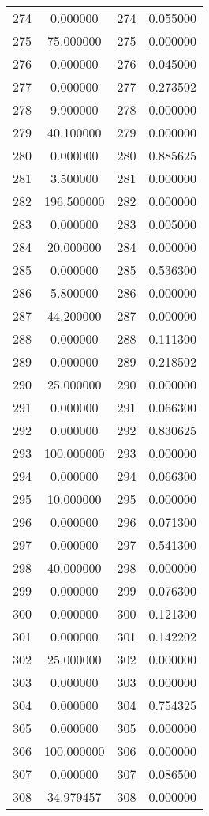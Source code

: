 \documentclass[12pt]{article}
\begin{document}
\begin{longtable}{@{}cccc@{}}
274 & 0.000000 & 274 & 0.055000 \\
275 & 75.000000 & 275 & 0.000000 \\
276 & 0.000000 & 276 & 0.045000 \\
277 & 0.000000 & 277 & 0.273502 \\
278 & 9.900000 & 278 & 0.000000 \\
279 & 40.100000 & 279 & 0.000000 \\
280 & 0.000000 & 280 & 0.885625 \\
281 & 3.500000 & 281 & 0.000000 \\
282 & 196.500000 & 282 & 0.000000 \\
283 & 0.000000 & 283 & 0.005000 \\
284 & 20.000000 & 284 & 0.000000 \\
285 & 0.000000 & 285 & 0.536300 \\
286 & 5.800000 & 286 & 0.000000 \\
287 & 44.200000 & 287 & 0.000000 \\
288 & 0.000000 & 288 & 0.111300 \\
289 & 0.000000 & 289 & 0.218502 \\
290 & 25.000000 & 290 & 0.000000 \\
291 & 0.000000 & 291 & 0.066300 \\
292 & 0.000000 & 292 & 0.830625 \\
293 & 100.000000 & 293 & 0.000000 \\
294 & 0.000000 & 294 & 0.066300 \\
295 & 10.000000 & 295 & 0.000000 \\
296 & 0.000000 & 296 & 0.071300 \\
297 & 0.000000 & 297 & 0.541300 \\
298 & 40.000000 & 298 & 0.000000 \\
299 & 0.000000 & 299 & 0.076300 \\
300 & 0.000000 & 300 & 0.121300 \\
301 & 0.000000 & 301 & 0.142202 \\
302 & 25.000000 & 302 & 0.000000 \\
303 & 0.000000 & 303 & 0.000000 \\
304 & 0.000000 & 304 & 0.754325 \\
305 & 0.000000 & 305 & 0.000000 \\
306 & 100.000000 & 306 & 0.000000 \\
307 & 0.000000 & 307 & 0.086500 \\
308 & 34.979457 & 308 & 0.000000 \\

\end{longtable}
\end{document}
